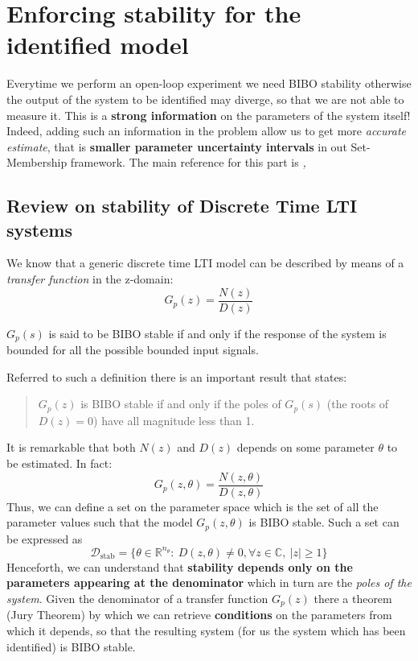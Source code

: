 \chapter{Enforcing stability for the identified model}

\textsf{Everytime we perform an open-loop experiment we need BIBO stability otherwise the output of the system to be identified may diverge, so that we are not able to measure it. This is a \textbf{strong information} on the parameters of the system itself! Indeed, adding such an information in the problem allow us to get more \textit{accurate estimate}, that is \textbf{smaller parameter uncertainty intervals} in out Set-Membership framework. The main reference for this part is \citeauthor{cerone2011enforcing} \textit{,  \cite{cerone2011enforcing}}}

\section{Review on stability of Discrete Time LTI systems}
We know that a generic discrete time LTI model can be described by means of a \textit{transfer function} in the z-domain:
\begin{equation}
    G_p(z)=\frac{N(z)}{D(z)}
\end{equation}
\begin{definition}
    $G_p(s)$ is said to be BIBO stable if and only if the response of the system is bounded for all the possible bounded input signals.
\end{definition}

\noindent
Referred to such a definition there is an important result that states: 
\begin{quotation}
    $G_p(z)$ is BIBO stable if and only if the poles of $G_p(s)$ (the roots of $D(z)=0$) have all magnitude less than 1.
 \end{quotation}
\noindent
 It is remarkable that both $N(z)$ and $D(z)$ depends on some parameter $\theta$ to be estimated. In fact:
 \begin{equation}
    G_p(z,\theta)=\frac{N(z,\theta)}{D(z,\theta)}
 \end{equation}
 Thus, we can define a set on the parameter space which is the set of all the parameter values such that the model $G_p(z,\theta)$ is BIBO stable. Such a set can be expressed as
 \begin{equation}
    \mathcal{D}_{\text{stab}}=\{
        \theta\in\mathbb{R}^{n_\theta} : \ D(z,\theta)\ne{0}, \forall{z}\in\mathbb{C}, \ \vert z \vert \ge 1
    \}
 \end{equation}
Henceforth, we can understand that \textbf{stability depends only on the parameters appearing at the denominator} which in turn are the \textit{poles of the system}. Given the denominator of a transfer function $G_p(z)$ there a  theorem (Jury Theorem) by which we can retrieve \textbf{conditions} on the parameters from which it depends, so that the resulting system (for us the system which has been identified) is BIBO stable. 


